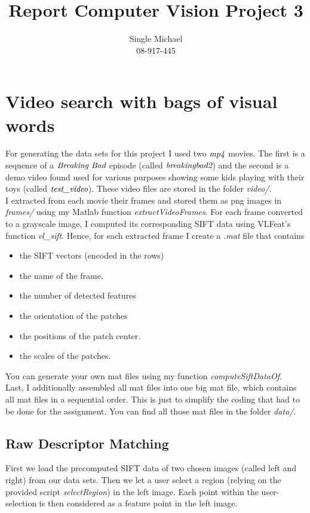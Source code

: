 \documentclass{paper}
\title{Report Computer Vision Project 3}
\author{Single Michael\\08-917-445}
\begin{document}
\maketitle


\section{Video search with bags of visual words}
For generating the data sets for this project I used two $\emph{mp4}$ movies. The first is a sequence of a $\emph{Breaking Bad}$ episode (called $\emph{breakingbad2}$) and the second is a demo video found used for various purposes showing some kids playing with their toys 
(called $\emph{test\_video}$). These video files are stored in the folder \emph{video/}. \\

I extracted from each movie their frames and stored them as png images in \emph{frames/} using my Matlab function \emph{extractVideoFrames}. For each frame converted to a grayscale image, I computed its corresponding SIFT data using VLFeat's function \emph{vl\_sift}.
Hence, for each extracted frame I create a \emph{.mat} file that contains 

\begin{itemize}
    \item the SIFT vectors (encoded in the rows)
    \item the name of the frame.
    \item the number of detected features
    \item the orientation of the patches
    \item the positions of the patch center.
    \item the scales of the patches.
\end{itemize}

You can generate your own mat files using my function \emph{computeSiftDataOf}. \\

Last, I additionally assembled all mat files into one big mat file, which contains all mat files in a sequential order. This is just to simplify the coding that had to be done for the assignment. You can find all those mat files in the folder \emph{data/}. \\

\subsection{Raw Descriptor Matching}
First we load the precomputed SIFT data of two chosen images (called left and right) from our data sets. Then we let a user select a region (relying on the provided script \emph{selectRegion}) in the left image. Each point within the user-selection is then considered as a feature point in the left image. \\
\end{document}
